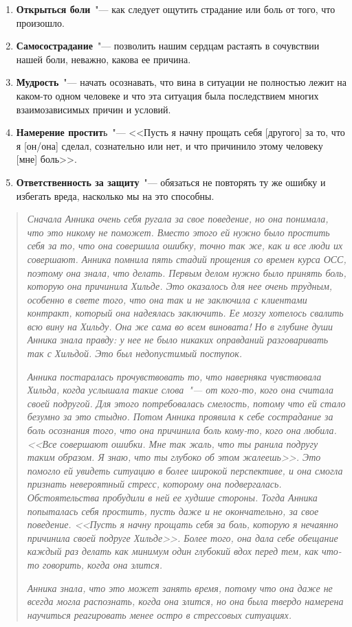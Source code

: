 \begin{enumerate}
	\item \textbf{Открыться боли}~"--- как следует ощутить страдание или боль от того, что произошло.
	
	\item \textbf{Самосострадание}~"--- позволить нашим сердцам растаять в сочувствии нашей боли, неважно, какова ее причина.
	
	\item \textbf{Мудрость}~"--- начать осознавать, что вина в ситуации не полностью лежит на каком-то одном человеке и что эта ситуация была последствием многих взаимозависимых причин и условий.
	
	\item \textbf{Намерение простит}ь~"--- <<Пусть я начну прощать себя [другого] за то, что я
	[он/она] сделал, сознательно или нет, и что причинило этому человеку [мне] боль>>.
	
	\item \textbf{Ответственность за защиту}~"--- обязаться не повторять ту же ошибку и избегать вреда, насколько мы на это способны.
\end{enumerate}

\begin{quotation}
	\textit{
		Сначала Анника очень себя ругала за свое поведение, но она понимала, что это никому не поможет. Вместо этого ей нужно было простить себя за то, что она совершила ошибку, точно так же, как и все люди их совершают. Анника помнила пять стадий прощения со времен курса ОСС, поэтому она знала, что делать. Первым делом нужно было принять боль, которую она причинила Хильде. Это оказалось для нее очень трудным, особенно в свете того, что она так и не заключила с клиентами контракт, который она надеялась заключить. Ее мозгу хотелось свалить всю вину на Хильду. Она же сама во всем виновата! Но в глубине души Анника знала правду: у нее не было никаких оправданий разговаривать так с Хильдой. Это был недопустимый поступок.
	}
	
	\textit{
		Анника постаралась прочувствовать то, что наверняка чувствовала Хильда, когда услышала такие слова~"--- от кого-то, кого она считала своей подругой. Для этого потребовалась смелость, потому что ей стало безумно за это стыдно. Потом Анника проявила к себе сострадание за боль осознания того, что она причинила боль кому-то, кого она любила. <<Все совершают ошибки. Мне так жаль, что ты ранила подругу таким образом. Я знаю, что ты глубоко об этом жалеешь>>. Это помогло ей увидеть ситуацию в более широкой перспективе, и она смогла признать невероятный стресс, которому она подвергалась. Обстоятельства пробудили в ней ее худшие стороны. Тогда Анника попыталась себя простить, пусть даже и не окончательно, за свое поведение. <<Пусть я начну прощать себя за боль, которую я нечаянно причинила своей подруге Хильде>>. Более того, она дала себе обещание каждый раз делать как минимум один глубокий вдох перед тем, как что-то говорить, когда она злится.
	}
	
	\textit{
		Анника знала, что это может занять время, потому что она даже не всегда могла распознать, когда она злится, но она была твердо намерена научиться реагировать менее остро в стрессовых ситуациях.
	} 
\end{quotation}


